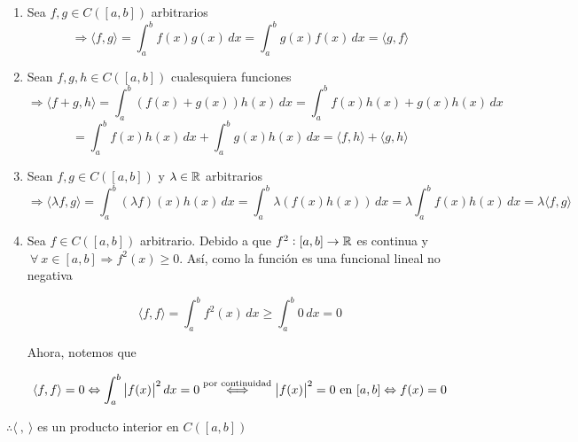 \begin{proofexplanation}
    \begin{enumerate}
        \item Sea $f,g \in C([a,b]) $ arbitrarios
        \begin{equation*}
            \Rightarrow \langle f , g \rangle = \int_{a}^{b} f(x)g(x) \, dx =  \int_{a}^{b} g(x)f(x) \, dx = \langle g , f \rangle
        \end{equation*}
        \item Sean $f,g,h \in C([a,b]) $ cualesquiera funciones
        \begin{equation*}
            \Rightarrow \langle f + g, h \rangle = \int_{a}^{b} (f(x)+g(x))h(x) \, dx = \int_{a}^{b} f(x)h(x)+g(x)h(x) \, dx 
        \end{equation*}
        \begin{equation*}
            = \int_{a}^{b} f(x)h(x)\, dx + \int_{a}^{b} g(x)h(x)\, dx =  \langle f , h \rangle +  \langle  g, h \rangle
        \end{equation*}
        \item Sean $f,g \in  C([a,b])$ y $\lambda \in \mathbb{R}$ arbitrarios
        \begin{equation*}
            \Rightarrow \langle \lambda f, g  \rangle  = \int_{a}^{b} (\lambda f)(x)h(x)\, dx = \int_{a}^{b} \lambda( f(x)h(x))\, dx =  \lambda \int_{a}^{b}  f(x)h(x)\, dx = \lambda \langle  f, g  \rangle 
        \end{equation*}
        \item Sea $f \in  C([a,b])$ arbitrario. Debido a que $f^2 : [a,b] \to \mathbb{R}$ es continua y $\: \forall \: x \in [a,b] \Rightarrow f^2 (x) \geqslant 0$. Así, como la función es una funcional lineal no negativa 

        \begin{equation*}
            \langle f, f \rangle = \int_{a}^{b} f^2(x)\, dx \geqslant \int_{a}^{b} 0 \, dx = 0
        \end{equation*}

        Ahora, notemos que

        \begin{equation*}
            \langle f, f \rangle=0 \Leftrightarrow \int_a^b \abs{f(x)}^2\,dx=0\stackrel{\text{por continuidad}}\Longleftrightarrow \abs{f(x)}^2=0\,\,\text{en}\,\,[a,b]\Leftrightarrow f(x)=0
        \end{equation*}
    \end{enumerate}
    $\therefore \langle \: , \: \rangle$ es un producto interior en $C([a,b])$
\end{proofexplanation}

